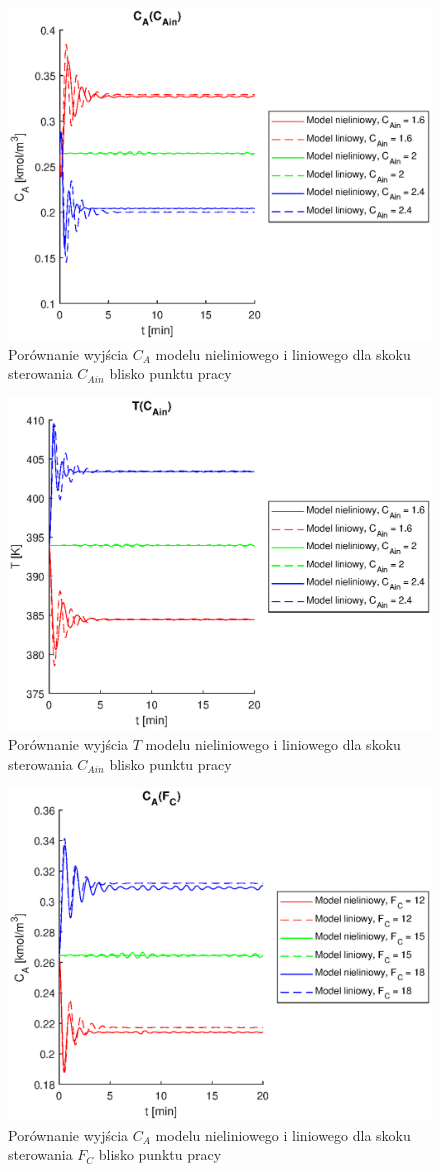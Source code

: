 \begin{figure}
	\centering
	\includegraphics[width=.8\linewidth]{plot/lin_cacain_0.eps}
	\caption{Porównanie wyjścia $C_A$ modelu nieliniowego i liniowego dla skoku sterowania $C_{Ain}$ blisko punktu pracy}
	\label{fig:lincacain0}
\end{figure}
\begin{figure}
\centering
\includegraphics[width=.8\linewidth]{plot/lin_tcain_0.eps}
\caption{Porównanie wyjścia $T$ modelu nieliniowego i liniowego dla skoku sterowania $C_{Ain}$ blisko punktu pracy}
\label{fig:lintcain0}
\end{figure}
\begin{figure}
\centering
\includegraphics[width=.8\linewidth]{plot/lin_cafc_0.eps}
\caption{Porównanie wyjścia $C_A$ modelu nieliniowego i liniowego dla skoku sterowania $F_C$ blisko punktu pracy}
\label{fig:lincafc0}
\end{figure}
